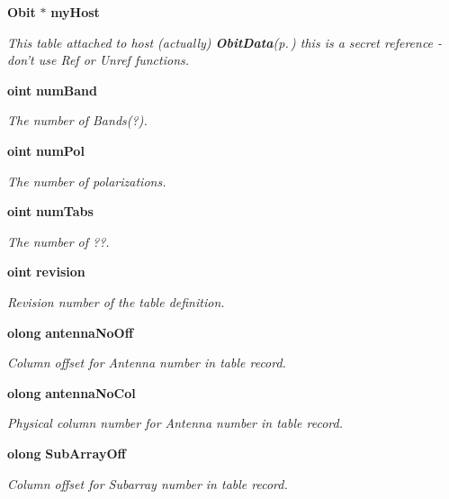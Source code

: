 \begin{CompactItemize}
{\bf Obit} $\ast$ {\bf my\-Host}
\begin{CompactList}\small\item\em This table attached to host (actually) {\bf Obit\-Data}{\rm (p.\,\pageref{structObitData})} this is a secret reference - don't use Ref or Unref functions. \item\end{CompactList}\item 
{\bf oint} {\bf num\-Band}
\begin{CompactList}\small\item\em The number of Bands(?). \item\end{CompactList}\item 
{\bf oint} {\bf num\-Pol}
\begin{CompactList}\small\item\em The number of polarizations. \item\end{CompactList}\item 
{\bf oint} {\bf num\-Tabs}
\begin{CompactList}\small\item\em The number of ??. \item\end{CompactList}\item 
{\bf oint} {\bf revision}
\begin{CompactList}\small\item\em Revision number of the table definition. \item\end{CompactList}\item 
{\bf olong} {\bf antenna\-No\-Off}
\begin{CompactList}\small\item\em Column offset for Antenna number in table record. \item\end{CompactList}\item 
{\bf olong} {\bf antenna\-No\-Col}
\begin{CompactList}\small\item\em Physical column number for Antenna number in table record. \item\end{CompactList}\item 
{\bf olong} {\bf Sub\-Array\-Off}
\begin{CompactList}\small\item\em Column offset for Subarray number in table record. \item\end{CompactList}\item 

\end{CompactItemize}
